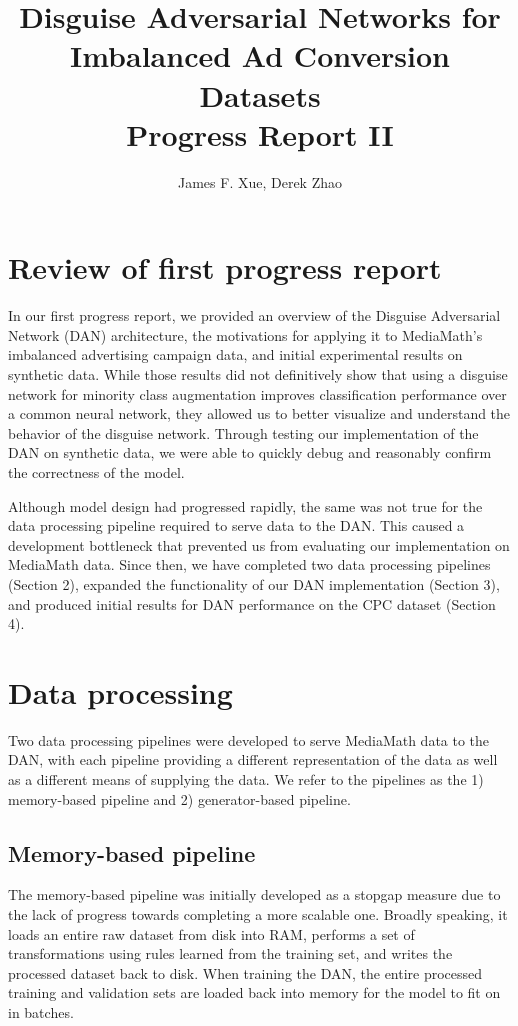 \documentclass{proc}
\begin{document}
\title{Disguise Adversarial Networks for Imbalanced Ad Conversion Datasets \\
	\large{Progress Report II}}

\author{James F. Xue, Derek Zhao}

\maketitle

\section{Review of first progress report}

In our first progress report, we provided an overview of the Disguise Adversarial Network (DAN) architecture, the motivations for applying it to MediaMath's imbalanced advertising campaign data, and initial experimental results on synthetic data. While those results did not definitively show that using a disguise network for minority class augmentation improves classification performance over a common neural network, they allowed us to better visualize and understand the behavior of the disguise network. Through testing our implementation of the DAN on synthetic data, we were able to quickly debug and reasonably confirm the correctness of the model.

Although model design had progressed rapidly, the same was not true for the data processing pipeline required to serve data to the DAN. This caused a development bottleneck that prevented us from evaluating our implementation on MediaMath data. Since then, we have completed two data processing pipelines (Section 2), expanded the functionality of our DAN implementation (Section 3), and produced initial results for DAN performance on the CPC dataset (Section 4).

\section{Data processing}

Two data processing pipelines were developed to serve MediaMath data to the DAN, with each pipeline providing a different representation of the data as well as a different means of supplying the data. We refer to the pipelines as the 1) memory-based pipeline and 2) generator-based pipeline.

\subsection{Memory-based pipeline}
The memory-based pipeline was initially developed as a stopgap measure due to the lack of progress towards completing a more scalable one. Broadly speaking, it loads an entire raw dataset from disk into RAM, performs a set of transformations using rules learned from the training set, and writes the processed dataset back to disk. When training the DAN, the entire processed training and validation sets are loaded back into memory for the model to fit on in batches.
\end{document}
